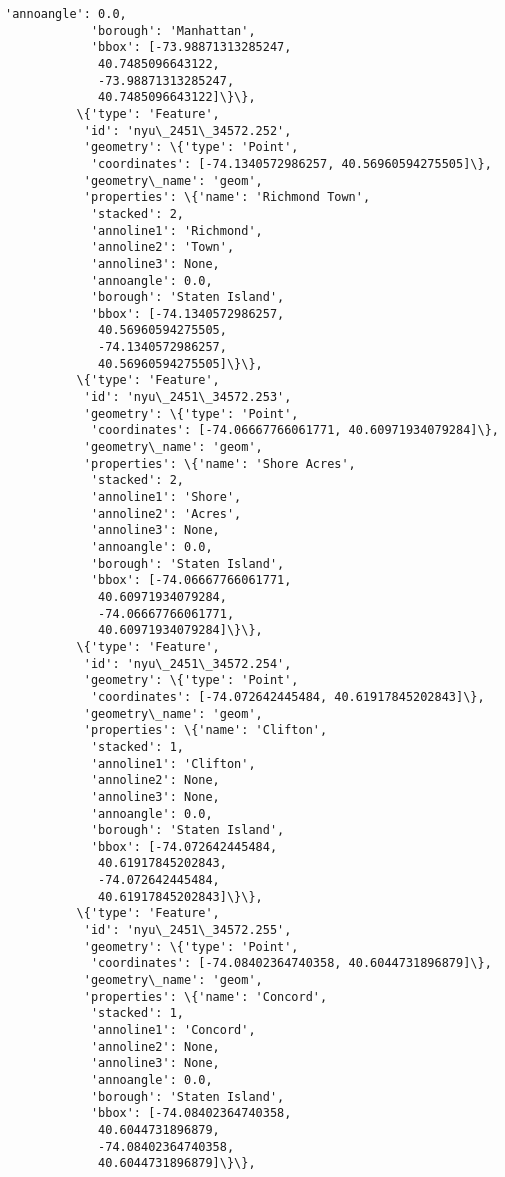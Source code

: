 \documentclass[11pt]{article}
\begin{document}
\begin{Verbatim}[commandchars=\\\{\}]
            'annoangle': 0.0,
            'borough': 'Manhattan',
            'bbox': [-73.98871313285247,
             40.7485096643122,
             -73.98871313285247,
             40.7485096643122]\}\},
          \{'type': 'Feature',
           'id': 'nyu\_2451\_34572.252',
           'geometry': \{'type': 'Point',
            'coordinates': [-74.1340572986257, 40.56960594275505]\},
           'geometry\_name': 'geom',
           'properties': \{'name': 'Richmond Town',
            'stacked': 2,
            'annoline1': 'Richmond',
            'annoline2': 'Town',
            'annoline3': None,
            'annoangle': 0.0,
            'borough': 'Staten Island',
            'bbox': [-74.1340572986257,
             40.56960594275505,
             -74.1340572986257,
             40.56960594275505]\}\},
          \{'type': 'Feature',
           'id': 'nyu\_2451\_34572.253',
           'geometry': \{'type': 'Point',
            'coordinates': [-74.06667766061771, 40.60971934079284]\},
           'geometry\_name': 'geom',
           'properties': \{'name': 'Shore Acres',
            'stacked': 2,
            'annoline1': 'Shore',
            'annoline2': 'Acres',
            'annoline3': None,
            'annoangle': 0.0,
            'borough': 'Staten Island',
            'bbox': [-74.06667766061771,
             40.60971934079284,
             -74.06667766061771,
             40.60971934079284]\}\},
          \{'type': 'Feature',
           'id': 'nyu\_2451\_34572.254',
           'geometry': \{'type': 'Point',
            'coordinates': [-74.072642445484, 40.61917845202843]\},
           'geometry\_name': 'geom',
           'properties': \{'name': 'Clifton',
            'stacked': 1,
            'annoline1': 'Clifton',
            'annoline2': None,
            'annoline3': None,
            'annoangle': 0.0,
            'borough': 'Staten Island',
            'bbox': [-74.072642445484,
             40.61917845202843,
             -74.072642445484,
             40.61917845202843]\}\},
          \{'type': 'Feature',
           'id': 'nyu\_2451\_34572.255',
           'geometry': \{'type': 'Point',
            'coordinates': [-74.08402364740358, 40.6044731896879]\},
           'geometry\_name': 'geom',
           'properties': \{'name': 'Concord',
            'stacked': 1,
            'annoline1': 'Concord',
            'annoline2': None,
            'annoline3': None,
            'annoangle': 0.0,
            'borough': 'Staten Island',
            'bbox': [-74.08402364740358,
             40.6044731896879,
             -74.08402364740358,
             40.6044731896879]\}\},

\end{Verbatim}
\end{document}
